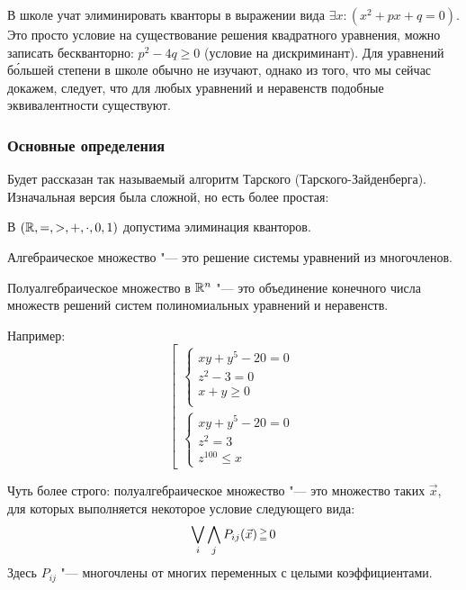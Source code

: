 	\begin{exmp}
	В школе учат элиминировать кванторы в выражении вида $\exists x \colon (x^2 + px + q = 0)$.
	Это просто условие на существование решения квадратного уравнения, можно записать бескванторно: $p^2-4q \ge 0$ (условие на дискриминант).
	Для уравнений б\'ольшей степени в школе обычно не изучают, однако из того, что мы сейчас докажем,
	следует, что для любых уравнений и неравенств подобные эквивалентности существуют.
	\end{exmp}

\subsubsection{Основные определения}
	Будет рассказан так называемый алгоритм Тарского (Тарского-Зайденберга).
	Изначальная версия была сложной, но есть более простая:
	\begin{theorem}\label{tarski_seidenberg}
		В $(\mathbb{R}, =, >, +, \cdot, 0, 1)$ допустима элиминация кванторов.
	\end{theorem}

	\begin{Def}
		Алгебраическое множество "--- это решение системы уравнений из многочленов.
	\end{Def}

	\begin{Def}
		Полуалгебраическое множество в $\mathbb{R}^n$ "--- это объединение конечного числа
		множеств решений систем полиномиальных уравнений и неравенств.
	\end{Def}
	\begin{Rem}
		Например:
		\[
			\left[
			\begin{array}{l}
				\begin{cases}
					xy+y^5 - 20 = 0 \\
					z^2 - 3 = 0 \\
					x + y \ge 0 \\
				\end{cases}\\
				\begin{cases}
					xy+y^5 - 20 = 0 \\
					z^2 = 3 \\
					z^{100} \le x
				\end{cases}
			\end{array}
			\right.
		\]
	\end{Rem}
	\begin{Rem}
		Чуть более строго: полуалгебраическое множество "--- это множество таких $\vec x$, для которых выполняется некоторое условие следующего вида:
		\[ \bigvee_i \bigwedge_j P_{ij}(\vec x) \begin{smallmatrix}>\\=\end{smallmatrix} 0 \]
		Здесь $P_{ij}$ "--- многочлены от многих переменных с целыми коэффициентами.
	\end{Rem}

